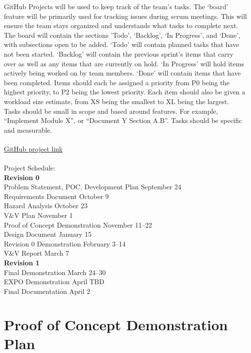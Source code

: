 \documentclass{article}
\begin{document}
GitHub Projects will be used to keep track of the team’s tasks. The ‘board’ feature will be primarily used for tracking issues during scrum meetings. This will ensure the team stays organized and understands what tasks to complete next.
The board will contain the sections ’Todo’, ‘Backlog’, ‘In Progress’, and ‘Done’, with subsections open to be added. ‘Todo’ will contain planned tasks that have not been started. ‘Backlog’ will contain the previous sprint’s items that carry over as well as any items that are currently on hold. ‘In Progress’ will hold items actively being worked on by team members. ‘Done’ will contain items that have been completed.
Items should each be assigned a priority from P0 being the highest priority, to P2 being the lowest priority. Each item should also be given a workload size estimate, from XS being the smallest to XL being the largest.
Tasks should be small in scope and based around features. For example, “Implement Module X”, or “Document Y Section A.B”. Tasks should be specific and measurable.
\\\\
\href{https://github.com/users/Nicholas-Fabugais-Inaba/projects/3}{GitHub project link}
\\\\
Project Schedule:\\
\indent \textbf{Revision 0}\\
\indent Problem Statement, POC, Development Plan \hfill September 24\\
\indent Requirements Document \hfill October 9\\
\indent Hazard Analysis \hfill October 23\\
\indent V\&V Plan \hfill November 1\\
\indent Proof of Concept Demonstration \hfill November 11--22\\
\indent Design Document \hfill January 15\\
\indent Revision 0 Demonstration \hfill February 3--14\\
\indent V\&V Report \hfill March 7\\
\indent \textbf{Revision 1}\\
\indent Final Demonstration \hfill March 24--30\\
\indent EXPO Demonstration \hfill April TBD\\
\indent Final Documentation \hfill April 2\\

\section{Proof of Concept Demonstration Plan}
\end{document}
